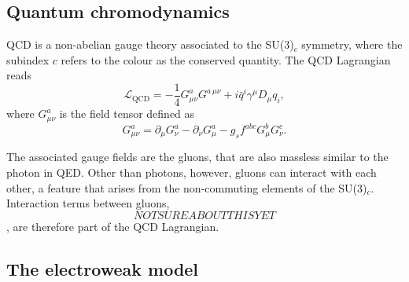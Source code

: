 \subsection{Quantum chromodynamics}
QCD is a non-abelian gauge theory associated to the SU(3)$_c$ symmetry, where the subindex $c$ refers to the colour as the conserved quantity. 
The QCD Lagrangian reads
\begin{equation}
      \mathcal{L}_{\text{QCD}} = -\frac{1}{4}G_{\mu\nu}^aG^{a\,\mu\nu} + i \bar{q}^i \gamma^\mu D_\mu q_i,  \label{eq:lqcd}
    \end{equation}
    where $G_{\mu\nu}^a$ is the field tensor defined as
    \begin{equation}
      G_{\mu\nu}^a = \partial_\mu G_\nu^a - \partial_\nu G_\mu^a - g_s f^{abc}G_\mu^b G_\nu^c.
    \end{equation}


    The associated gauge fields are the gluons, that are also massless similar to the photon in QED. Other than photons, however, gluons can interact with each other, a feature that arises from the non-commuting elements of the SU(3)$_c$. Interaction terms between gluons, 
\begin{equation}
    NOT SURE ABOUT THIS YET
\end{equation}
    , are therefore part of the QCD Lagrangian.
    



\subsection{The electroweak model}


